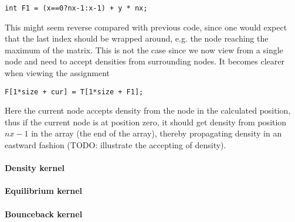 \begin{verbatim}
int F1 = (x==0?nx-1:x-1) + y * nx;
\end{verbatim}

This might seem reverse compared with previous code, since one would expect that the last index should be wrapped around, e.g. the node reaching the maximum of the matrix. This is not the case since we now view from a single node and need to accept densities from surrounding nodes. It becomes clearer when viewing the assignment

\begin{verbatim}
F[1*size + cur] = T[1*size + F1];
\end{verbatim}

Here the current node accepts density from the node in the calculated position, thus if the current node is at position zero, it should get density from position $nx-1$ in the array (the end of the array), thereby propagating density in an eastward fashion (TODO: illustrate the accepting of density).


\paragraph{Density kernel}



\paragraph{Equilibrium kernel}



\paragraph{Bounceback kernel}





